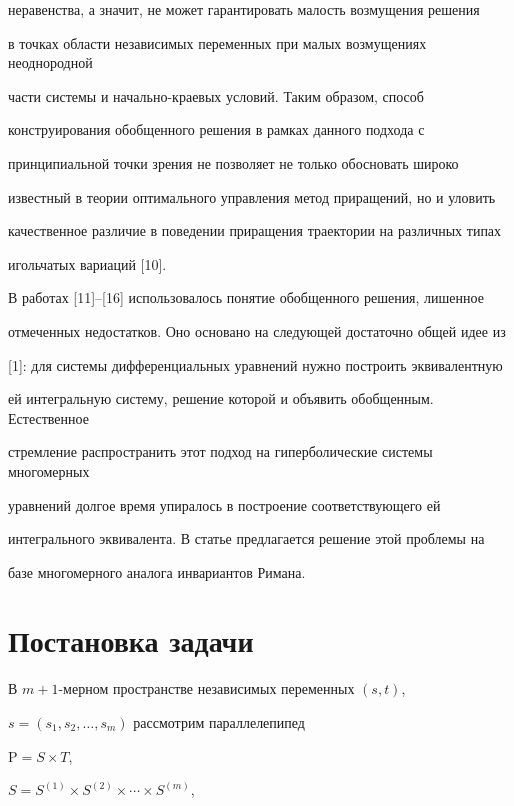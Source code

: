 неравенства, а значит, не может гарантировать малость возмущения решения


в точках области независимых переменных при малых возмущениях неоднородной 


части системы и начально-краевых условий. Таким образом, способ 


конструирования обобщенного решения в рамках данного подхода с 


принципиальной точки зрения не позволяет не только обосновать широко 


известный в теории оптимального управления метод приращений, но и уловить 


качественное различие в поведении приращения траектории на различных типах 


игольчатых вариаций [10].





В работах [11]--[16] использовалось понятие обобщенного решения, лишенное 


отмеченных недостатков. Оно основано на следующей достаточно общей идее из


[1]: для системы дифференциальных уравнений нужно построить эквивалентную


ей интегральную систему, решение которой и объявить обобщенным. Естественное 


стремление распространить этот подход на гиперболические системы многомерных 


уравнений долгое время упиралось в построение соответствующего ей 


интегрального эквивалента. В статье предлагается решение этой проблемы на 


базе многомерного аналога инвариантов Римана.





\section{Постановка задачи}





В $m+1$-мерном пространстве независимых переменных $(s,t)$, 


$s = (s_1,s_2,\dotsc,s_m)$ рассмотрим параллелепипед


${\mathrm P} = S \times T$, 


$S = S^{(1)} \times S^{(2)} \times \dotsb \times S^{(m)}$, 


